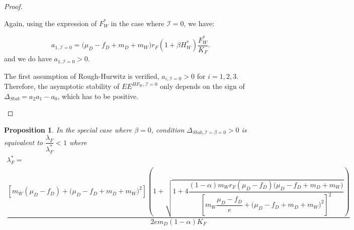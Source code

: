 \documentclass{article}
\newcommand{\lfw}{\lambda_{F}}
\newcommand{\lfw}{\lambda_{F}}
\newcommand{\cI}{\mathcal{I}}
\newtheorem{prop}{Proposition}
\begin{document}
\begin{proof}
\begin{itemize}
Again, using the expression of $F^*_W$ in the case where $\cI = 0$, we have:

\begin{equation*}
a_{1, \cI =0} = \big( \mu_D  -f_D + m_D + m_W) r_F(1+ \beta H_W^*) \dfrac{F^*_W}{K_F} .
\end{equation*}
and we do have $a_{1, \cI =0} > 0$.

The first assumption of Rough-Hurwitz is verified, $a_{i, \cI =0} > 0$ for $i=1,2,3$. Therefore, the asymptotic stability of $EE^{HF_W,  \cI =0}$ only depends on the sign of $\Delta_{Stab}= a_2 a_1 - a_0$, which has to be positive. 
\end{itemize}
\end{proof}


\begin{prop}
In the special case where $\beta = 0$, condition $\Delta_{Stab, \cI =\beta =0} > 0$ is equivalent to $\dfrac{\lfw}{\lfw^*} < 1$ where
\begin{multline*}
\lfw^* = \\
 \dfrac{\left[m_{W}(\mu_{D}-f_{D})+\big(\mu_{D}-f_{D}+m_{D}+m_{W})^{2}\right]\left(1+\sqrt{1+4\dfrac{(1-\alpha)m_{W}r_{F}\left(\mu_{D}-f_{D}\right)\big(\mu_{D}-f_{D}+m_{D}+m_{W})}{\left[m_{W}\dfrac{\mu_{D}-f_{D}}{e}+\big(\mu_{D}-f_{D}+m_{D}+m_{W})^{2}\right]^{2}}}\right)}{2em_D (1-\alpha) K_F }
\end{multline*}
\end{prop}
\end{document}
